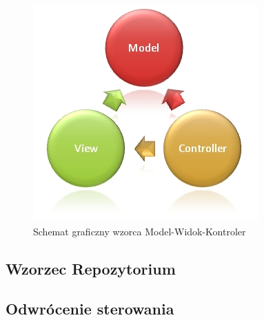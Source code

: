 \newpage
\begin{figure}[ht]
	\centering
		\includegraphics[width=0.5\linewidth]{assets/03_1.jpg}
	\caption{Schemat graficzny wzorca Model-Widok-Kontroler}
	\label{fig:kanji-giri}
\end{figure}

\subsection{Wzorzec Repozytorium} %
\label{sub:wzorzec_repozytorium}


\subsection{Odwrócenie sterowania} %
\label{sub:odwr_cenie_sterowania}

